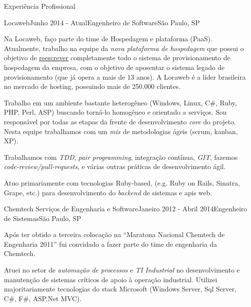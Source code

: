 \documentclass{resume} %
\begin{document}
\begin{rSection}{Experiência Profissional}
  \begin{rSubsection}{Locaweb}{Junho 2014 - Atual}{Engenheiro de Software}{São
      Paulo, SP}

  \item Na Locaweb, faço parte do time de Hospedagem e plataforma (PaaS).
    Atualmente, trabalho na equipe da {\em nova plataforma de hospedagem} que
    possui o objetivo de \underline{reescrever} completamente todo o sistema de
    provisionamento de hospedagem da empresa, com o objetivo de aposentar o
    sistema legado de provisionamento (que já opera a mais de 13 anos). A
    Locaweb é a líder brasileira no mercado de hosting, possuindo mais de
    250.000 clientes.

  \item Trabalho em um ambiente bastante heterogêneo (Windows, Linux, C\#, Ruby,
    PHP, Perl, ASP) buscando torná-lo homogêneo e orientado a serviços. Sou
    responsável por todas as etapas da frente de desenvolvimento {\em core} do
    projeto. Nesta equipe trabalhamos com um {\em mix} de metodologias ágeis
    (scrum, kanban, XP).

  \item Trabalhamos com {\em TDD}, {\em pair programming}, integração contínua,
    {\em GIT}, fazemos {\em code-review/pull-requests}, e várias outras práticas
    de desenvolvimento ágil.

  \item Atuo primariamente com tecnologias Ruby-based, (e.g. Ruby on Rails,
    Sinatra, Grape, etc.) para desenvolvimento do {\em backend} de sistemas e
    apis web.
  \end{rSubsection}

  \begin{rSubsection}{Chemtech Serviços de Engenharia e Software}{Janeiro 2012 -
      Abril 2014}{Engenheiro de Sistemas}{São Paulo, SP}

  \item Após ter obtido a terceira colocação na ``Maratona Nacional Chemtech de
    Engenharia 2011'' fui convidado a fazer parte do time de engenharia da
    Chemtech.

  \item Atuei no setor de {\em automação de processos} e {\em TI Industrial} no
    desenvolvimento e manutenção de sistemas críticos de apoio à operação
    industrial. Utilizei majoritariamente tecnologias do stack Microsoft
    (Windows Server, Sql Server, C\#, F\#, ASP.Net MVC).


\end{rSubsection}
\end{rSection}
\end{document}

